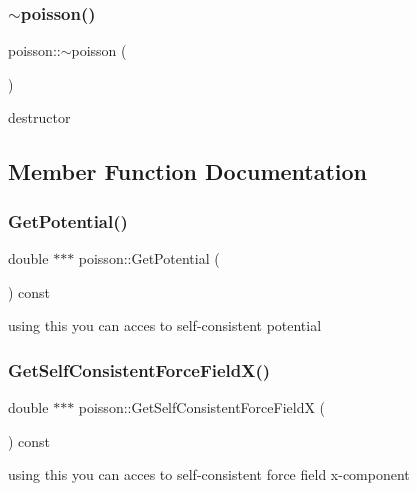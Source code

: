 \subsubsection{\texorpdfstring{$\sim$poisson()}{~poisson()}}
{\footnotesize\ttfamily poisson\+::$\sim$poisson (\begin{DoxyParamCaption}{ }\end{DoxyParamCaption})}



destructor 



\subsection{Member Function Documentation}
\mbox{\label{classpoisson_a63c221d801cfda8164b7ec6ebdbadbbb}} 
\subsubsection{\texorpdfstring{Get\+Potential()}{GetPotential()}}
{\footnotesize\ttfamily double $\ast$$\ast$$\ast$ poisson\+::\+Get\+Potential (\begin{DoxyParamCaption}{ }\end{DoxyParamCaption}) const}



using this you can acces to self-\/consistent potential 

\mbox{\label{classpoisson_ac0aa69f7fc50385430fe4e4b90ad452e}} 
\subsubsection{\texorpdfstring{Get\+Self\+Consistent\+Force\+Field\+X()}{GetSelfConsistentForceFieldX()}}
{\footnotesize\ttfamily double $\ast$$\ast$$\ast$ poisson\+::\+Get\+Self\+Consistent\+Force\+FieldX (\begin{DoxyParamCaption}{ }\end{DoxyParamCaption}) const}



using this you can acces to self-\/consistent force field x-\/component 

